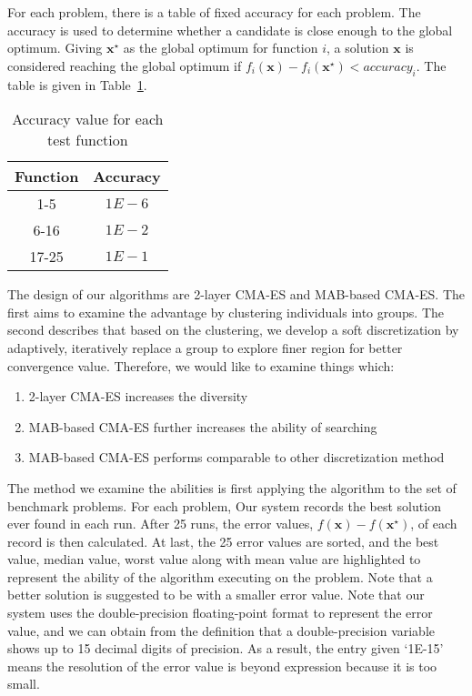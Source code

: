 For each problem, there is a table of fixed accuracy for each problem.
The accuracy is used to determine whether a candidate is close enough to
the global optimum.
Giving $\mathbf{x^\star}$ as the global optimum for function $i$, a solution
$\mathbf{x}$ is considered reaching the global optimum if $f_i(\mathbf{x}) -
f_i(\mathbf{x^\star}) < accuracy_i$. 
The table is given in Table~\ref{table:accuracy}.

\begin{table}
\centering
\begin{tabular}{c|c}
Function & Accuracy \\\hline
1-5      &  $1E-6$  \\\hline
6-16     &  $1E-2$  \\\hline
17-25    &  $1E-1$  \\
\end{tabular}
\caption{Accuracy value for each test function}
\label{table:accuracy}
\end{table}

The design of our algorithms are 2-layer CMA-ES and MAB-based CMA-ES.
The first aims to examine the advantage by clustering individuals
into groups.
The second describes that based on the clustering, we develop a soft
discretization by adaptively, iteratively replace a group to explore finer region
for better convergence value.
Therefore, we would like to examine things which:
\begin{enumerate}
  \item{2-layer CMA-ES increases the diversity}
  \item{MAB-based CMA-ES further increases the ability of searching}
  \item{MAB-based CMA-ES performs comparable to other discretization
    method}
  \end{enumerate}
The method we examine the abilities is first applying the algorithm to
the set of benchmark problems. For each problem, Our system records
the best solution ever found in each run. After 25 runs, the error
values, $f(\mathbf{x}) -f(\mathbf{x^\star})$, of each record is then
calculated.
At last, the 25 error values are sorted, and the best value, median
value, worst value along with mean value are highlighted to represent
the ability of the algorithm executing on the problem. Note that a
better solution is suggested to be with a smaller error value.
Note that our system uses the double-precision floating-point format to
represent the error value, and we can obtain from the definition that a
double-precision variable shows up to 15 decimal digits of precision.
As a result, the entry given `1E-15' means the resolution of the error
value is beyond expression because it is too small.   



